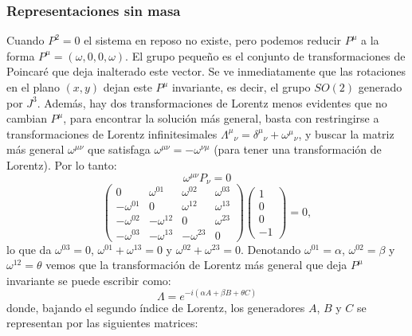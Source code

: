 \documentclass[a4paper,11pt]{book} %
\begin{document}
\subsubsection{Representaciones sin masa} 
\noindent
Cuando $P^{2}=0$ el sistema en reposo no existe, pero podemos reducir $P^{\mu}$ a la forma $P^{\mu}=(\omega,0,0,\omega)$. El grupo pequeño es el conjunto de transformaciones de Poincaré que deja inalterado este vector. Se ve inmediatamente que las rotaciones en el plano $(x,y)$ dejan este $P^{\mu}$ invariante, es decir, el grupo $SO(2)$ generado por $J^{3}$. Además, hay dos transformaciones de Lorentz menos evidentes que no cambian $P^{\mu}$, para encontrar la solución más general, basta con restringirse a transformaciones de Lorentz infinitesimales ${\Lambda^{\mu}}_{\nu}={\delta^{\mu}}_{\nu}+{\omega^{\mu}}_{\nu}$, y buscar la matriz más general $\omega^{\mu\nu}$ que satisfaga $\omega^{\mu\nu}=-\omega^{\nu\mu}$ (para tener una transformación de Lorentz). Por lo tanto:
\begin{equation}
\omega^{\mu\nu}P_{\nu}=0
\end{equation} 
\begin{equation}
\begin{pmatrix}0&\omega^{01}&\omega^{02}&\omega^{03}\\ -\omega^{01}&0&\omega^{12}&\omega^{13}\\ -\omega^{02}&-\omega^{12}&0&\omega^{23}\\ -\omega^{03}&-\omega^{13}&-\omega^{23}&0\end{pmatrix}\begin{pmatrix}1\\ 0\\ 0\\ -1\end{pmatrix}=0,
\end{equation} %
lo que da $\omega^{03}=0$, $\omega^{01}+\omega^{13}=0$ y $\omega^{02}+\omega^{23}=0$. Denotando $\omega^{01}=\alpha$, $\omega^{02}=\beta$ y $\omega^{12}=\theta$ vemos que la transformación de Lorentz más general que deja $P^{\mu}$ invariante se puede escribir como:
\begin{equation}
\Lambda=e^{-i(\alpha A+\beta B+\theta C)}
\end{equation} 
\noindent
donde, bajando el segundo índice de Lorentz, los generadores $A$, $B$ y $C$ se representan por las siguientes matrices:
\end{document}
